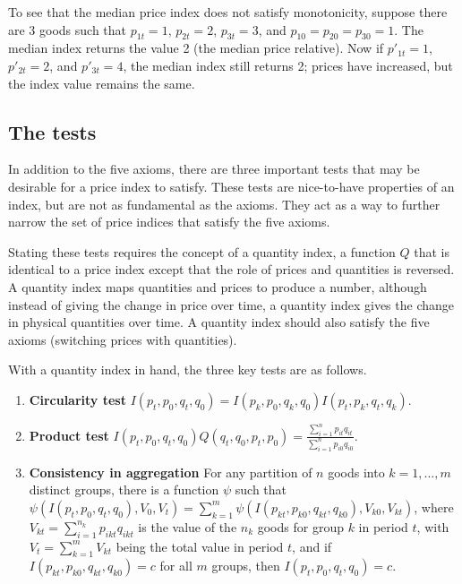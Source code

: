 \documentclass[
]{article}
\begin{document}
To see that the median price index does not satisfy monotonicity, suppose there are 3 goods such that \(p_{1t} = 1\), \(p_{2t} = 2\), \(p_{3t} = 3\), and \(p_{10} = p_{20} = p_{30} = 1\). The median index returns the value 2 (the median price relative). Now if \(p'_{1t} = 1\), \(p'_{2t} = 2\), and \(p'_{3t} = 4\), the median index still returns 2; prices have increased, but the index value remains the same.

\hypertarget{the-tests}{%
\subsection{The tests}\label{the-tests}}

In addition to the five axioms, there are three important tests that may be desirable for a price index to satisfy. These tests are nice-to-have properties of an index, but are not as fundamental as the axioms. They act as a way to further narrow the set of price indices that satisfy the five axioms.

Stating these tests requires the concept of a quantity index, a function \(Q\) that is identical to a price index except that the role of prices and quantities is reversed. A quantity index maps quantities and prices to produce a number, although instead of giving the change in price over time, a quantity index gives the change in physical quantities over time. A quantity index should also satisfy the five axioms (switching prices with quantities).

With a quantity index in hand, the three key tests are as follows.

\begin{enumerate}
\def\labelenumi{\arabic{enumi}.}
\item
  \textbf{Circularity test} \(I(p_{t}, p_{0}, q_{t}, q_{0}) = I(p_{k}, p_{0}, q_{k}, q_{0}) I(p_{t}, p_{k}, q_{t}, q_{k})\).
\item
  \textbf{Product test} \(I(p_{t}, p_{0}, q_{t}, q_{0}) Q(q_{t}, q_{0}, p_{t}, p_{0}) = \frac{\sum_{i = 1}^{n} p_{it}q_{it}}{\sum_{i = 1}^{n} p_{i0}q_{i0}}\).
\item
  \textbf{Consistency in aggregation} For any partition of \(n\) goods into \(k = 1, \ldots, m\) distinct groups, there is a function \(\psi\) such that \(\psi(I(p_{t}, p_{0}, q_{t}, q_{0}), V_{0}, V_{t}) = \sum_{k = 1}^{m} \psi(I(p_{kt}, p_{k0}, q_{kt}, q_{k0}), V_{k0}, V_{kt})\), where \(V_{kt} = \sum_{i = 1}^{n_{k}} p_{ikt}q_{ikt}\) is the value of the \(n_{k}\) goods for group \(k\) in period \(t\), with \(V_{t} = \sum_{k = 1}^{m} V_{kt}\) being the total value in period \(t\), and if \(I(p_{kt}, p_{k0}, q_{kt}, q_{k0}) = c\) for all \(m\) groups, then \(I(p_{t}, p_{0}, q_{t}, q_{0}) = c\).
\end{enumerate}
\end{document}
